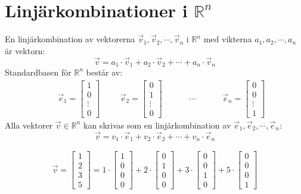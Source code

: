 \section{Linjärkombinationer i $\mathbb{R}^n$} %
\label{sec:linj_rkombinationer_i_}
En linjärkombination av vektorerna $\vec{v}_1, \vec{v}_2, \cdots, \vec{v}_n$ i $\mathbb{R}^n$ med vikterna $a_1, a_2, \cdots, a_n$ är vektorn:
\[
    \vec{v} = a_1 \cdot \vec{v}_1 + a_2 \cdot \vec{v}_2 + \cdots + a_n \cdot \vec{v}_n
\]
Standardbasen för $\mathbb{R}^n$ består av:
\begin{align*}
&&\vec{e}_1 = \begin{bmatrix} 1\\0\\\vdots\\0 \end{bmatrix}
&&&\vec{e}_2 = \begin{bmatrix} 0\\1\\\vdots\\0 \end{bmatrix}
&&&&\cdots
&&&&\vec{e}_n = \begin{bmatrix} 0\\0\\\vdots\\1 \end{bmatrix}
\end{align*}
Alla vektorer $\vec{v} \in \mathbb{R}^n$ kan skrivas som en linjärkombination av $\vec{e}_1, \vec{e}_2, \cdots, \vec{e}_n$:
\[
    \vec{v} = v_1 \cdot \vec{e}_1 + v_2 \cdot \vec{e}_2 + \cdots + v_n \cdot \vec{e}_n
\]
\begin{Ex}
    \begin{gather*}
    \vec{v} = \begin{bmatrix} 1\\2\\3\\5 \end{bmatrix} = 1 \cdot \begin{bmatrix} 1\\0\\0\\0 \end{bmatrix} + 2 \cdot \begin{bmatrix} 0\\1\\0\\0 \end{bmatrix} + 3 \cdot \begin{bmatrix} 0\\0\\1\\0 \end{bmatrix} + 5 \cdot \begin{bmatrix} 0\\0\\0\\1 \end{bmatrix}
    \end{gather*}
\end{Ex}

